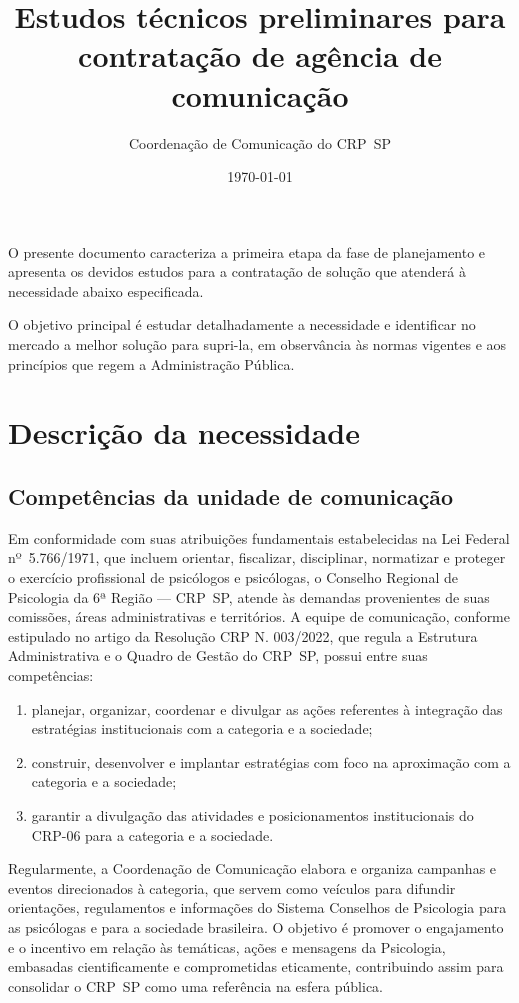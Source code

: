 \documentclass[oneside,a4paper,article]{memoir}
\title{Estudos técnicos preliminares para contratação de agência de comunicação}
\author{Coordenação de Comunicação do CRP~SP}
\date{\today}
\begin{document}
\pagestyle{crp}
\maketitle

O presente documento caracteriza a primeira etapa da fase de
planejamento e apresenta os devidos estudos para a contratação de
solução que atenderá à necessidade abaixo especificada.

O objetivo principal é estudar detalhadamente a necessidade e
identificar no mercado a melhor solução para supri-la, em observância às
normas vigentes e aos princípios que regem a Administração Pública.
\vspace{3\baselineskip}

\chapter{Descrição da necessidade}

\section{Competências da unidade de comunicação}

Em conformidade com suas atribuições fundamentais estabelecidas na Lei
Federal nº~5.766/1971, que incluem orientar, fiscalizar, disciplinar,
normatizar e proteger o exercício profissional de psicólogos e
psicólogas, o Conselho Regional de Psicologia da 6ª Região --- CRP~SP,
atende às demandas provenientes de suas comissões, áreas administrativas
e territórios. A equipe de comunicação, conforme estipulado no artigo da
Resolução CRP N. 003/2022, que regula a Estrutura Administrativa e o
Quadro de Gestão do CRP~SP, possui entre suas competências:

\begin{enumerate}
	\item
	      planejar, organizar, coordenar e divulgar as ações referentes à
	      integração das estratégias institucionais com a categoria e a
	      sociedade;
	\item
	      construir, desenvolver e implantar estratégias com foco na aproximação
	      com a categoria e a sociedade;
	\item
	      garantir a divulgação das atividades e posicionamentos institucionais
	      do CRP-06 para a categoria e a sociedade.
\end{enumerate}

Regularmente, a Coordenação de Comunicação elabora e organiza campanhas
e eventos direcionados à categoria, que servem como veículos para
difundir orientações, regulamentos e informações do Sistema Conselhos de
Psicologia para as psicólogas e para a sociedade brasileira. O objetivo
é promover o engajamento e o incentivo em relação às temáticas, ações e
mensagens da Psicologia, embasadas cientificamente e comprometidas
eticamente, contribuindo assim para consolidar o CRP~SP como uma
referência na esfera pública.
\end{document}
